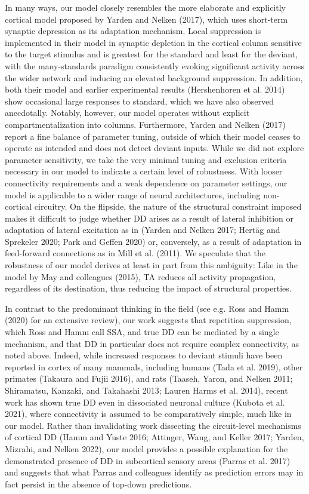 \documentclass[pdflatex,referee,iicol,sn-basic]{sn-jnl}
\begin{document}
In many ways, our model closely resembles the more elaborate and explicitly cortical model proposed by Yarden and Nelken (2017), which uses short-term synaptic depression as its adaptation mechanism. Local suppression is implemented in their model in synaptic depletion in the cortical column sensitive to the target stimulus and is greatest for the standard and least for the deviant, with the many-standards paradigm consistently evoking significant activity across the wider network and inducing an elevated background suppression. In addition, both their model and earlier experimental results (Hershenhoren et al. 2014) show occasional large responses to standard, which we have also observed anecdotally. Notably, however, our model operates without explicit compartmentalization into columns. Furthermore, Yarden and Nelken (2017) report a fine balance of parameter tuning, outside of which their model ceases to operate as intended and does not detect deviant inputs. While we did not explore parameter sensitivity, we take the very minimal tuning and exclusion criteria necessary in our model to indicate a certain level of robustness. With looser connectivity requirements and a weak dependence on parameter settings, our model is applicable to a wider range of neural architectures, including non-cortical circuitry. On the flipside, the nature of the structural constraint imposed makes it difficult to judge whether DD arises as a result of lateral inhibition or adaptation of lateral excitation as in (Yarden and Nelken 2017; Hertäg and Sprekeler 2020; Park and Geffen 2020) or, conversely, as a result of adaptation in feed-forward connections as in Mill et al. (2011). We speculate that the robustness of our model derives at least in part from this ambiguity: Like in the model by May and colleagues (2015), TA reduces all activity propagation, regardless of its destination, thus reducing the impact of structural properties.

In contrast to the predominant thinking in the field (see e.g. Ross and Hamm (2020) for an extensive review), our work suggests that repetition suppression, which Ross and Hamm call SSA, and true DD can be mediated by a single mechanism, and that DD in particular does not require complex connectivity, as noted above. Indeed, while increased responses to deviant stimuli have been reported in cortex of many mammals, including humans (Tada et al. 2019), other primates (Takaura and Fujii 2016), and rats (Taaseh, Yaron, and Nelken 2011; Shiramatsu, Kanzaki, and Takahashi 2013; Lauren Harms et al. 2014), recent work has shown true DD even in dissociated neuronal culture (Kubota et al. 2021), where connectivity is assumed to be comparatively simple, much like in our model. Rather than invalidating work dissecting the circuit-level mechanisms of cortical DD (Hamm and Yuste 2016; Attinger, Wang, and Keller 2017; Yarden, Mizrahi, and Nelken 2022), our model provides a possible explanation for the demonstrated presence of DD in subcortical sensory areas (Parras et al. 2017) and suggests that what Parras and colleagues identify as prediction errors may in fact persist in the absence of top-down predictions.
\end{document}
